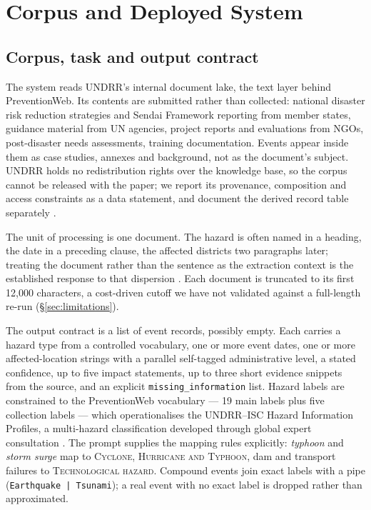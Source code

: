 
\section{Corpus and Deployed System}
\label{sec:corpus}

\subsection{Corpus, task and output contract}
\label{ssec:corpus-task}

The system reads UNDRR's internal document lake, the text layer behind
PreventionWeb. Its contents are submitted rather than collected: national
disaster risk reduction strategies and Sendai Framework reporting from member
states, guidance material from UN agencies, project reports and evaluations
from NGOs, post-disaster needs assessments, training documentation. Events
appear inside them as case studies, annexes and background, not as the
document's subject. UNDRR holds no redistribution rights over the knowledge
base, so the corpus cannot be released with the paper; we report its
provenance, composition and access constraints as a data statement, and
document the derived record table separately
\citep{bender2018DataStatements,gebru2021Datasheets}.

The unit of processing is one document. The hazard is often named in a
heading, the date in a preceding clause, the affected districts two paragraphs
later; treating the document rather than the sentence as the extraction
context is the established response to that dispersion
\citep{li2021WikiEvents,ebner2020RAMS,tong2022DocEE}. Each document is
truncated to its first 12{,}000 characters, a cost-driven cutoff we have not
validated against a full-length re-run (\S\ref{sec:limitations}).

The output contract is a list of event records, possibly empty. Each carries a
hazard type from a controlled vocabulary, one or more event dates, one or more
affected-location strings with a parallel self-tagged administrative level, a
stated confidence, up to five impact statements, up to three short evidence
snippets from the source, and an explicit \texttt{missing\_information} list.
Hazard labels are constrained to the PreventionWeb vocabulary --- 19 main
labels plus five collection labels --- which operationalises the UNDRR--ISC
Hazard Information Profiles, a multi-hazard classification developed through
global expert consultation \citep{murray2021HazardProfiles}. The prompt
supplies the mapping rules explicitly: \emph{typhoon} and \emph{storm surge}
map to \textsc{Cyclone, Hurricane and Typhoon}, dam and transport failures to
\textsc{Technological hazard}. Compound events join exact labels with a pipe
(\texttt{Earthquake | Tsunami}); a real event with no exact label is dropped
rather than approximated.

